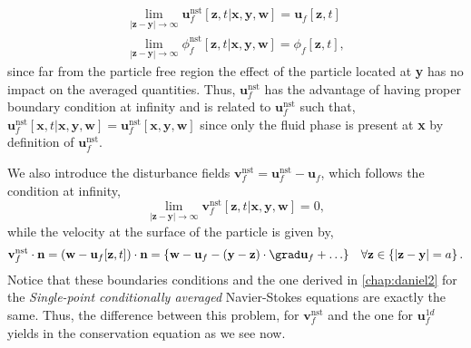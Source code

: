 \begin{align*}
    \lim_{|\textbf{z} - \textbf{y}|\to \infty}
    \textbf{u}^\text{nst}_f[\textbf{z},t|\textbf{x},\textbf{y},\textbf{w}]
    = \textbf{u}_f[\textbf{z},t]\\
    \lim_{|\textbf{z} - \textbf{y}|\to \infty}
    \phi^\text{nst}_f[\textbf{z},t|\textbf{x},\textbf{y},\textbf{w}]
    = \phi_f[\textbf{z},t],
    \label{eq:boundary}
\end{align*}
since far from the particle free region the effect of the particle located at \textbf{y} has no impact on the averaged quantities. 
Thus, $\textbf{u}^\text{nst}_f$ has the advantage of having proper boundary condition at infinity and is related to $\textbf{u}_f^\text{nst}$ such that, $\textbf{u}^\text{nst}_f[\textbf{x},t|\textbf{x},\textbf{y},\textbf{w}] = \textbf{u}_f^\text{nst}[\textbf{x},\textbf{y},\textbf{w}]$ since only the fluid phase is present at \textbf{x} by definition of $\textbf{u}^\text{nst}_f$. 

We also introduce the disturbance fields $\textbf{v}_f^\text{nst} = \textbf{u}_f^\text{nst} - \textbf{u}_f$, which follows the condition at infinity, 
\begin{equation}
    \lim_{|\textbf{z} - \textbf{y}|\to \infty}
    \textbf{v}^\text{nst}_f[\textbf{z},t|\textbf{x},\textbf{y},\textbf{w}]
    = 0,
\end{equation}
while the velocity at the surface of the particle is given by, 
\begin{equation}
    \textbf{v}^\text{nst}_f\cdot \textbf{n}
    = 
    (\textbf{w} - \textbf{u}_f[\textbf{z},t])\cdot \textbf{n}
    = 
    \left\{
        \textbf{w}
        - \textbf{u}_f
        - (\textbf{y} - \textbf{z})\cdot \grad\textbf{u}_f
        + \ldots 
    \right\}
    \;\;\; \forall \textbf{z}\in \left\{ |\textbf{z} - \textbf{y}| = a  \right\}. 
    \label{eq:bounday2}
\end{equation}
Notice that these boundaries conditions and the one derived in \ref{chap:daniel2} for the \textit{Single-point conditionally averaged} Navier-Stokes equations  are exactly the same.
Thus, the difference between this problem, for $\textbf{v}_f^\text{nst}$ and the one for $\textbf{u}_f^{1d}$ yields in the conservation equation as we see now. 

